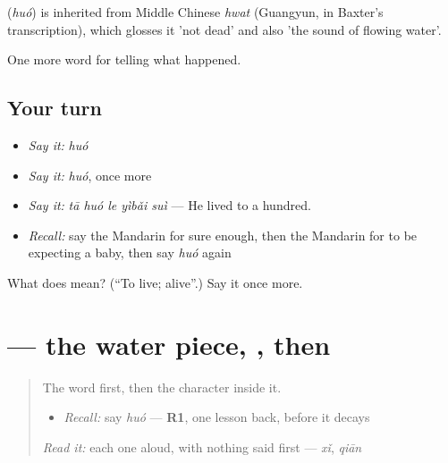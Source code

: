 \begin{cousinweb}
\textbf{} (\emph{huó}) is inherited from Middle Chinese \emph{hwat} (Guangyun, in Baxter's transcription), which glosses it 'not dead' and also 'the sound of flowing water'.
\end{cousinweb}

\begin{grammarlens}[title={What you've built}]
One more word for telling what happened.
\end{grammarlens}

\subsection*{Your turn}
\begin{itemize}
\raggedright
  \item \emph{Say it:} \emph{huó}
  \item \emph{Say it:} \emph{huó}, once more
  \item \emph{Say it:} \emph{tā huó le yìbǎi suì} — He lived to a hundred.
  \item \emph{Recall:} say the Mandarin for sure enough, then the Mandarin for to be expecting a baby, then say \emph{huó} again
\end{itemize}

\begin{tcolorbox}[breakable,colback=teal!4,colframe=teal!35!black,title={Before you move on}]
What does  mean? (\textquotedblleft{}To live; alive\textquotedblright{}.) Say it once more.
\end{tcolorbox}
\section[\texorpdfstring{\zh{活} (huó)}{活 (huó)}]{ — the water piece, , then }

\label{lesson:ZH-W302-huo-alive}



\begin{quote}
The word first, then the character inside it.

\begin{itemize}
\raggedright
  \item \emph{Recall:} say \emph{huó} — \textbf{R1}, one lesson back, before it decays
\end{itemize}

\begin{quote}
 
\end{quote}

\emph{Read it:} each one aloud, with nothing said first — \emph{xǐ}, \emph{qiān}
\end{quote}

